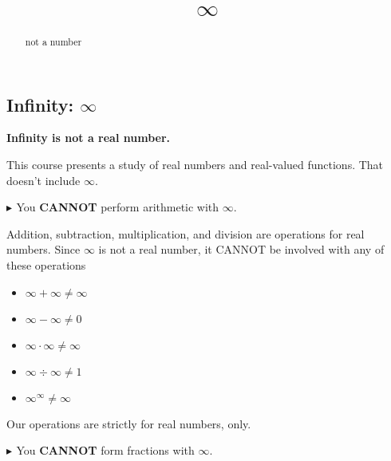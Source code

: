 \documentclass{ximera}
\title{$\infty$}
\begin{document}
\begin{abstract}
not a number
\end{abstract}
\maketitle




\subsection*{Infinity: $\infty$}


\begin{center}
\textbf{\textcolor{red!80!black}{Infinity is not a real number.}}
\end{center}




This course presents a study of real numbers and real-valued functions. That doesn't include $\infty$.




\textbf{\textcolor{red!90!darkgray}{$\blacktriangleright$ }} You \textbf{\textcolor{red!80!black}{CANNOT}} perform arithmetic with $\infty$.

Addition, subtraction, multiplication, and division are operations for real numbers.  Since $\infty$ is not a real number, it CANNOT be involved with any of these operations


\begin{example}


\begin{itemize}
\item $\infty + \infty \ne \infty$
\item $\infty - \infty \ne 0$
\item $\infty \cdot \infty \ne \infty$
\item $\infty \div \infty \ne 1$
\item $\infty^{\infty} \ne \infty$
\end{itemize}


\end{example}

Our operations are strictly for real numbers, only.









\textbf{\textcolor{red!90!darkgray}{$\blacktriangleright$ }} You \textbf{\textcolor{red!80!black}{CANNOT}} form fractions with $\infty$.
\end{document}
